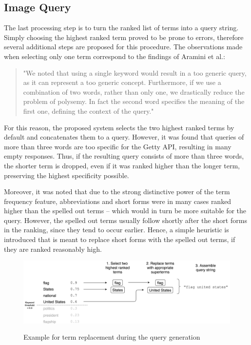\documentclass[11pt,a4paper,twoside]{article}
\begin{document}
\subsection{Image Query} \label{SystemQuery}

The last processing step is to turn the ranked list of terms into a query string. Simply choosing the highest ranked term proved to be prone to errors, therefore several additional steps are proposed for this procedure. The observations made when selecting only one term correspond to the findings of Aramini et al.:

\begin{quote}
"We noted that using a single keyword would result in a too generic query, as it can represent a too generic concept. Furthermore, if we use a combination of two words, rather than only one, we drastically reduce the problem of polysemy. In fact the second word specifies the meaning of the first one, defining the context of the query." \cite[p. 142]{Aramini2015AutomaticImages}
\end{quote}

For this reason, the proposed system selects the two highest ranked terms by default and concatenates them to a query. However, it was found that queries of more than three words are too specific for the Getty API, resulting in many empty responses. Thus, if the resulting query consists of more than three words, the shorter term is dropped, even if it was ranked higher than the longer term, preserving the highest specificity possible.

Moreover, it was noted that due to the strong distinctive power of the term frequency feature, abbreviations and short forms were in many cases ranked higher than the spelled out terms -- which would in turn be more suitable for the query. However, the spelled out terms usually follow shortly after the short forms in the ranking, since they tend to occur earlier. Hence, a simple heuristic is introduced that is meant to replace short forms with the spelled out terms, if they are ranked reasonably high.

\begin{figure}[h]
    \caption{Example for term replacement during the query generation}
    \centering
    \includegraphics[width=\columnwidth]{picpic-querygen.png}
    \label{fig:example-querygen}
\end{figure}
\end{document}
